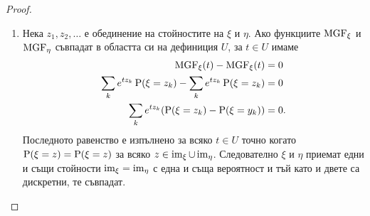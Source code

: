\documentclass[numbers=endperiod, DIV=15, bibliography=totocnumbered]{scrartcl}
\begin{document}
\begin{proof}
\begin{enumerate}
    \item Нека $z_1, z_2, \ldots$ е обединение на стойностите на $\xi$ и $\eta$. Ако функциите $\operatorname{MGF}_\xi$ и $\operatorname{MGF}_\eta$ съвпадат в областта си на дефиниция $U$, за $t \in U$ имаме
    \begin{align*}
      \operatorname{MGF}_\xi(t) - \operatorname{MGF}_\xi(t) &= 0
      \\
      \sum_k e^{t z_k} \operatorname{P}(\xi = z_k) - \sum_k e^{t z_k} \operatorname{P}(\xi = z_k) &= 0
      \\
      \sum_k e^{t z_k} (\operatorname{P}(\xi = z_k) - \operatorname{P}(\xi = y_k)) &= 0.
    \end{align*}
    Последното равенство е изпълнено за всяко $t \in U$ точно когато $\operatorname{P}(\xi = z) = \operatorname{P}(\xi = z)$ за всяко $z \in \operatorname{im}_\xi \cup \operatorname{im}_\eta$. Следователно $\xi$ и $\eta$ приемат едни и същи стойности $\operatorname{im}_\xi = \operatorname{im}_\eta$ с една и съща вероятност и тъй като и двете са дискретни, те съвпадат.
  \end{enumerate}
\end{proof}
\end{document}
